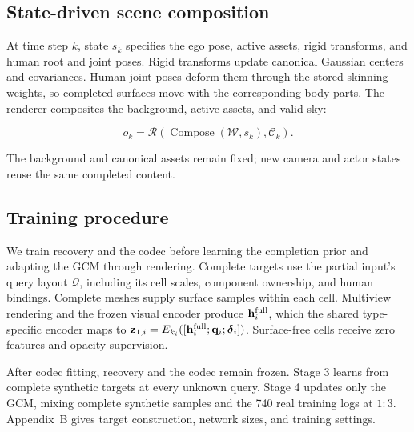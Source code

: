 \subsection{State-driven scene composition}
\label{sec:composition}

At time step $k$, state $s_k$ specifies the ego pose, active assets, rigid transforms, and human root and joint poses. Rigid transforms update canonical Gaussian centers and covariances. Human joint poses deform them through the stored skinning weights, so completed surfaces move with the corresponding body parts. The renderer composites the background, active assets, and valid sky:

\begin{equation}
o_k=\mathcal R(\operatorname{Compose}(\mathcal W,s_k),\mathcal C_k).
\label{eq:simulation}
\end{equation}

The background and canonical assets remain fixed; new camera and actor states reuse the same completed content.

\subsection{Training procedure}
\label{sec:training}
We train recovery and the codec before learning the completion prior and adapting the GCM through rendering. Complete targets use the partial input's query layout $\mathcal Q$, including its cell scales, component ownership, and human bindings. Complete meshes supply surface samples within each cell. Multiview rendering and the frozen visual encoder produce $\mathbf h_i^{\rm full}$, which the shared type-specific encoder maps to $\mathbf z_{1,i}=E_{k_i}([\mathbf h_i^{\rm full};\mathbf q_i;\boldsymbol\delta_i])$. Surface-free cells receive zero features and opacity supervision.

After codec fitting, recovery and the codec remain frozen. Stage 3 learns from complete synthetic targets at every unknown query. Stage 4 updates only the GCM, mixing complete synthetic samples and the 740 real training logs at $1{:}3$. Appendix~B gives target construction, network sizes, and training settings.
